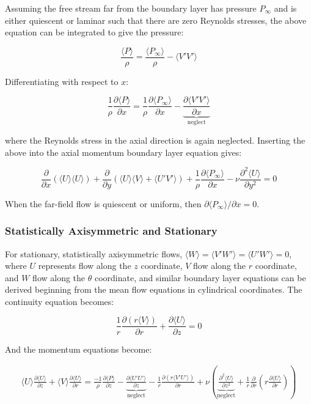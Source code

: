 \documentclass[10pt]{article}
\newcommand{\beq}{\begin{equation}}
\newcommand{\eeq}{\end{equation}}
\newcommand{\beqa}{\begin{equation}\begin{aligned}}
\newcommand{\eeqa}{\end{aligned}\end{equation}}
\newcommand{\la}{\langle}
\newcommand{\ra}{\rangle}
\begin{document}
\begin{flushleft}
Assuming the free stream far from the boundary layer has pressure \(P_{\infty}\) and is either quiescent or laminar such that there are zero Reynolds stresses, the above equation can be integrated to give the pressure:

\beq
\frac{\la P\ra}{\rho}=\frac{\la P_{\infty}\ra}{\rho}-\la V'V'\ra
\eeq

Differentiating with respect to \(x\):

\beq
\frac{1}{\rho}\frac{\partial \la P\ra}{\partial x}=\frac{1}{\rho}\frac{\partial \la P_{\infty}\ra}{\partial x}-\underbrace{\frac{\partial \la V'V'\ra}{\partial x}}_{\textrm{neglect}}
\eeq

where the Reynolds stress in the axial direction is again neglected. Inserting the above into the axial momentum boundary layer equation gives:

\beq
\frac{\partial}{\partial x}\left(\la U\ra\la U\ra\right)+\frac{\partial}{\partial y}\left(\la U\ra\la V\ra+\la U'V'\ra\right)+\frac{1}{\rho}\frac{\partial \la P_{\infty}\ra}{\partial x}-\nu\frac{\partial^2 \la U\ra}{\partial y^2}=0
\eeq

When the far-field flow is quiescent or uniform, then \(\partial\la P_{\infty}\ra/\partial x=0\). 



\subsubsection{Statistically Axisymmetric and Stationary}
For stationary, statistically axisymmetric flows, \(\la W\ra=\la V'W'\ra=\la U'W'\ra=0\), where \(U\) represents flow along the \(z\) coordinate, \(V\) flow along the \(r\) coordinate, and \(W\) flow along the \(\theta\) coordinate, and similar boundary layer equations can be derived beginning from the mean flow equations in cylindrical coordinates. The continuity equation becomes:

\beq
\frac{1}{r}\frac{\partial (r\la V\ra)}{\partial r}+\frac{\partial \la U\ra}{\partial z}=0
\eeq

And the momentum equations become:

\beqa
\la U\ra\frac{\partial \la U\ra}{\partial z}+\la V\ra\frac{\partial \la U\ra}{\partial r}=\frac{-1}{\rho}\frac{\partial \la P\ra}{\partial z}-\underbrace{\frac{\partial \la U'U'\ra}{\partial z}}_{\textrm{neglect}}-\frac{1}{r}\frac{\partial (r\la V'U'\ra)}{\partial r}+\nu\left(\underbrace{\frac{\partial^2\la U\ra}{\partial z^2}}_{\textrm{neglect}}+\frac{1}{r}\frac{\partial}{\partial r}\left(r\frac{\partial\la U\ra}{\partial r}\right)\right)
\eeqa


\end{flushleft}
\end{document}
